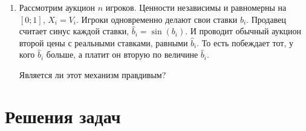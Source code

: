 \begin{enumerate}
\item Рассмотрим аукцион $ n $ игроков. Ценности независимы и равномерны на $ [0;1] $, $ X_{i}=V_{i} $. Игроки одновременно делают свои ставки $ b_{i} $. Продавец считает синус каждой ставки, $ \hat{b}_{i}=\sin (b_{i}) $. И проводит обычный аукцион второй цены с реальными ставками, равными $\hat{b}_{i}  $. То есть побеждает тот, у кого $ \hat{b}_{i} $ больше, а платит он вторую по величине $ \hat{b}_{i} $.

Является ли этот механизм правдивым?




\end{enumerate}








\section{Решения задач}
